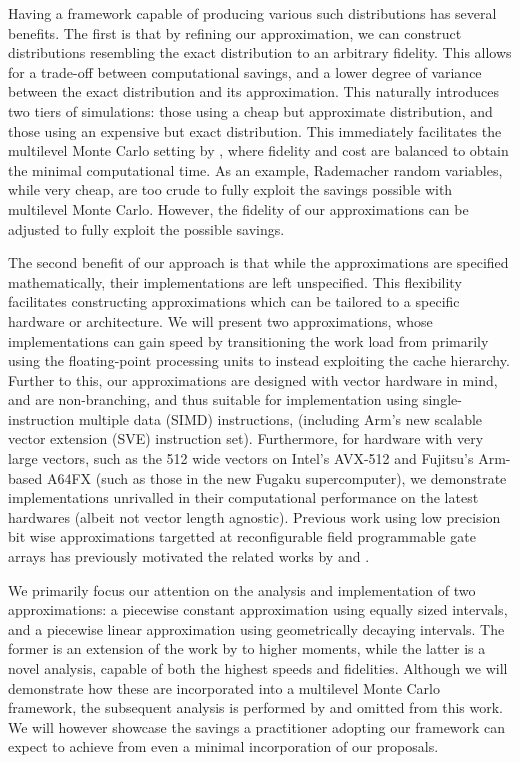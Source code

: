 \documentclass[manuscript,review]{acmart}
\begin{document}
Having a framework capable of producing various such distributions has several benefits. The first is that by refining our approximation, we can construct distributions resembling the exact distribution to an arbitrary fidelity. This allows for a trade-off between computational savings, and a lower degree of variance between the exact distribution and its approximation. This naturally  introduces two tiers of simulations: those using a cheap but approximate distribution, and those using an expensive but exact distribution. This immediately facilitates the multilevel Monte Carlo setting by \citet{giles2008multilevel}, where fidelity and cost are balanced to obtain the minimal computational time. As an example, Rademacher random variables, while very cheap, are too crude to fully exploit the savings possible with multilevel Monte Carlo. However, the fidelity of our approximations can be adjusted to fully exploit the possible savings. 

The second benefit of our approach is that while the approximations are  specified mathematically, their implementations are left unspecified. This flexibility facilitates constructing approximations which can be tailored to a specific hardware or architecture. We will present two approximations, whose implementations can gain speed by transitioning the work load from primarily using the floating-point processing units to instead exploiting the cache hierarchy. Further to this, our approximations are designed with vector hardware in mind, and are non-branching, and thus suitable for implementation using single-instruction multiple data (SIMD) instructions, (including Arm's new scalable vector extension (SVE) instruction set). Furthermore, for hardware with very large vectors, such as the \SI{512}{\bit} wide vectors on Intel's AVX-512 and Fujitsu's Arm-based A64FX (such as those in the new Fugaku supercomputer), we demonstrate implementations unrivalled in their computational performance on the latest hardwares (albeit not vector length agnostic). Previous work using low precision bit wise approximations targetted at reconfigurable field programmable gate arrays has previously motivated the related works by \citet{brugger2014mixed} and \citet{omland2015exploiting}.

We primarily focus our attention on the analysis and implementation of two approximations: a piecewise constant approximation using equally sized intervals, and a piecewise linear approximation using geometrically decaying intervals. The former is an extension of the work by \citet[theorem~1]{giles2019random_quadrature} to higher moments, while the latter is a novel analysis, capable of both the highest speeds and fidelities. Although we will demonstrate how these are incorporated into a multilevel Monte Carlo framework, the subsequent analysis is performed by \citeauthor{giles2020approximate} \citep{giles2020approximate,sheridan2020nested} and omitted from this work. We will however showcase the savings a practitioner adopting our framework can expect to achieve from even a minimal incorporation of our proposals. 
\end{document}
